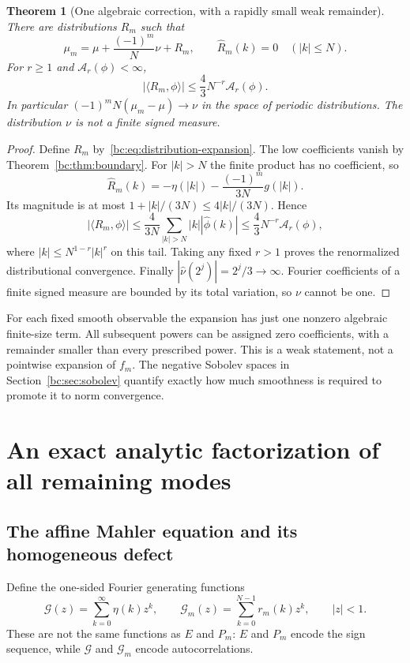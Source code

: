 \documentclass[11pt,a4paper,oneside,openany]{book}
\numberwithin{equation}{chapter}
\newtheorem{theorem}{Theorem}[chapter]
\theoremstyle{definition}
\theoremstyle{remark}
\newcommand{\abs}[1]{\left\lvert #1\right\rvert}
\newcommand{\pair}[2]{\langle #1,#2\rangle}
\newcommand{\Ast}{\mathcal A}
\begin{document}
\begin{theorem}[One algebraic correction, with a rapidly small weak remainder]
\label{bc:thm:distribution}
There are distributions $R_m$ such that
\begin{equation}
 \mu_m=\mu+\frac{(-1)^m}{N}\nu+R_m,
 \qquad \widehat R_m(k)=0\quad(|k|\le N).
 \label{bc:eq:distribution-expansion}
\end{equation}
For $r\ge1$ and $\Ast_r(\phi)<\infty$,
\begin{equation}
 \abs{\pair{R_m}{\phi}}\le\frac43N^{-r}\Ast_r(\phi).
 \label{bc:eq:R-bound}
\end{equation}
In particular $(-1)^mN(\mu_m-\mu)\to\nu$ in the space of periodic distributions.
The distribution $\nu$ is not a finite signed measure.
\end{theorem}
\begin{proof}
Define $R_m$ by~\eqref{bc:eq:distribution-expansion}. The low coefficients vanish
by Theorem~\ref{bc:thm:boundary}. For $|k|>N$ the finite product has no coefficient,
so
\[
 \widehat R_m(k)=-\eta(|k|)-\frac{(-1)^m}{3N}g(|k|).
\]
Its magnitude is at most $1+|k|/(3N)\le4|k|/(3N)$. Hence
\[
 |\pair{R_m}{\phi}|
 \le\frac4{3N}\sum_{|k|>N}|k||\widehat\phi(k)|
 \le\frac43N^{-r}\Ast_r(\phi),
\]
where $|k|\le N^{1-r}|k|^r$ on this tail. Taking any fixed $r>1$ proves the
renormalized distributional convergence. Finally
$|\widehat\nu(2^j)|=2^j/3\to\infty$. Fourier coefficients of a finite signed
measure are bounded by its total variation, so $\nu$ cannot be one.
\end{proof}

For each fixed smooth observable the expansion has just one nonzero algebraic
finite-size term. All subsequent powers can be assigned zero coefficients, with
a remainder smaller than every prescribed power. This is a weak statement, not
a pointwise expansion of $f_m$. The negative Sobolev spaces in
Section~\ref{bc:sec:sobolev} quantify exactly how much smoothness is required to
promote it to norm convergence.
\chapter{An exact analytic factorization of all remaining modes}
\label{bc:sec:analytic}

\section{The affine Mahler equation and its homogeneous defect}
Define the one-sided Fourier generating functions
\begin{equation}
 \mathcal G(z)=\sum_{k=0}^{\infty}\eta(k)z^k,\qquad
 \mathcal G_m(z)=\sum_{k=0}^{N-1}r_m(k)z^k,\qquad |z|<1.
 \label{bc:eq:H}
\end{equation}
These are not the same functions as $E$ and $P_m$: $E$ and $P_m$ encode the
sign sequence, while $\mathcal G$ and $\mathcal G_m$ encode autocorrelations.
\end{document}

